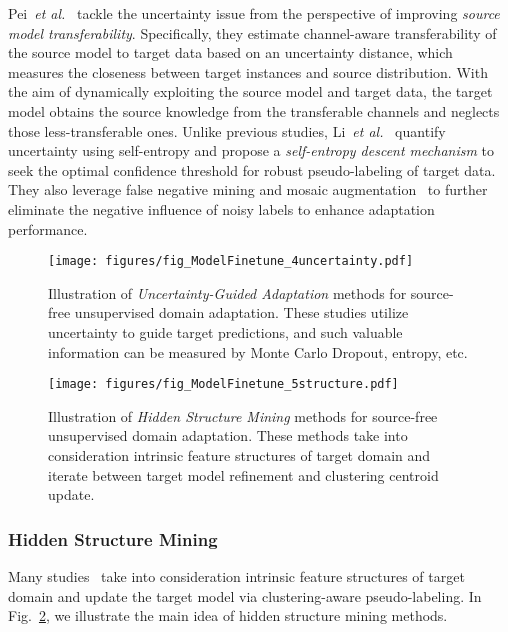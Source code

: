 \documentclass[10pt,journal,compsoc]{IEEEtran}
\def\etal{{\em et al.}}
\begin{document}
Pei~\etal~\cite{pei2022uncertainty} tackle the uncertainty issue from the perspective of improving \emph{source model transferability}.
Specifically, they estimate channel-aware transferability of the source model to target data based on an uncertainty distance, which measures the closeness between target instances and source distribution.
With the aim of dynamically exploiting the source model and target data, the target model obtains the source knowledge from the transferable channels and neglects those less-transferable ones.
Unlike previous studies, Li~\etal~\cite{li2021free} quantify uncertainty using self-entropy and propose a \emph{self-entropy descent mechanism} to seek the optimal confidence threshold for robust pseudo-labeling of target data.
They also leverage false negative mining and mosaic augmentation~\cite{bochkovskiy2020yolov4} %
to further eliminate the negative influence of noisy labels to enhance adaptation performance.




\begin{figure}[!t]
\setlength{\abovecaptionskip}{0pt}
\setlength{\belowcaptionskip}{-2pt}
\setlength{\abovedisplayskip}{-2pt}
\setlength{\belowdisplayskip}{-2pt}
	\centering
	\texttt{[image: figures/fig\_ModelFinetune\_4uncertainty.pdf]}
	\caption{Illustration of \emph{Uncertainty-Guided Adaptation} methods for source-free unsupervised domain adaptation.
	These studies utilize uncertainty to guide target predictions, and such valuable information can be measured by Monte Carlo Dropout, entropy, etc.
	}
	\label{fig_ModelFinetune_4uncertainty}
\end{figure}


\begin{figure}[!t]
\setlength{\abovecaptionskip}{0pt}
\setlength{\belowcaptionskip}{-2pt}
\setlength{\abovedisplayskip}{-2pt}
\setlength{\belowdisplayskip}{-2pt}
	\centering
	\texttt{[image: figures/fig\_ModelFinetune\_5structure.pdf]}
	\caption{Illustration of \emph{Hidden Structure Mining} methods for source-free unsupervised domain adaptation.
	These methods take into consideration intrinsic feature structures of target domain and iterate between target model refinement and clustering centroid update.}
	\label{fig_ModelFinetune_5structure}
\end{figure}

\subsubsection{Hidden Structure Mining}
Many studies~\cite{yang2021exploiting, yang2021generalized, tang2021nearest, liang2020we, liang2021source, lee2022confidence, li2022jacobian, yang2022attracting} take into consideration intrinsic feature structures of target domain and update the target model via clustering-aware pseudo-labeling. 
In Fig.~\ref{fig_ModelFinetune_5structure}, we illustrate the main idea of hidden structure mining methods. %
\end{document}
